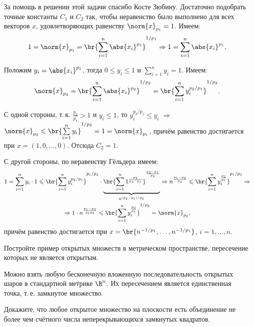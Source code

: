 \begin{solution}
    За помощь в решении этой задачи спасибо Косте Зюбину. Достаточно подобрать точные константы $C_1$ и $C_2$ так, чтобы неравенство было выполнено для всех векторов $x$, удовлетворяющих равенству $\norm{x}_{p_1} = 1$. Имеем:
    \[
        1 = \norm{x}_{p_1} = \br{\sum_{i = 1}^n\abs{x_i}^{p_1}}^{1 / p_1} \Rightarrow 1 = \sum_{i = 1}^n\abs{x_i}^{p_1}.
    \]

    Положим $y_i = \abs{x_i}^{p_1}$, тогда $0 \leqslant y_i \leqslant 1$ и $\sum\limits_{i = 1}^ny_i = 1$. Имеем:
    \[
        \norm{x}_{p_2} = \br{\sum_{i = 1}^n\abs{x_i}^{p_2}}^{1 / p_2} = \br{\sum_{i = 1}^ny_i^{p_2 / p_1}}^{1 / p_2}.
    \]

    С одной стороны, т.\,к. $\frac{p_2}{p_1} > 1$ и $y_i \leqslant 1$, то $y_i^{p_2 / p_1} \leqslant y_i$ $\Rightarrow$ $\norm{x}_{p_2} \leqslant \br{\sum\limits_{i = 1}^ny_i}^{1 / p_2} = 1 = \norm{x}_{p_1}$, причём равенство достигается при $x = (1, 0, \ldots, 0)$. Отсюда $C_2 = 1$.

    С другой стороны, по неравенству Гёльдера имеем:
    \begin{multline*}
        1 = \sum_{i = 1}^ny_i \cdot 1 \leqslant \br{\sum_{i = 1}^ny_i^{p_2 / p_1}}^{p_1 / p_2} \cdot \underbrace{\br{\sum_{i = 1}^n1^{\frac{p_2}{p_2 - p_1}}}^{\frac{p_2 - p_1}{p_2}}}_{n^{(p_2 - p_1) / p_2}} \Rightarrow
        n^{\frac{p_1 - p_2}{p_2}} \leqslant \br{\sum_{i = 1}^ny_i^{\frac{p_2}{p_1}}}^{p_1 / p_2} \Rightarrow \\ \Rightarrow 1 \cdot n^{\frac{p_1 - p_2}{p_1p_2}} \leqslant \br{\sum_{i = 1}^ny_i^{\frac{p_2}{p_1}}}^{1 / p_2} = \norm{x}_{p_2},
    \end{multline*}
    причём равенство достигается при $x = \br{n^{-1 / p_1}, \ldots, n^{-1 / p_1}}$, $i = 1, \ldots, n$.
\end{solution}

\begin{problem}[50$^\circ$]
    Постройте пример открытых множеств в метрическом пространстве, пересечение которых не является открытым.
\end{problem}

\begin{solution}
    Можно взять любую бесконечную вложенную последовательность открытых шаров в стандартной метрике $\R^n$. Их пересечением является единственная точка, т.\,е. замкнутое множество.
\end{solution}

\begin{problem}[51]
    Докажите, что любое открытое множество на плоскости есть объединение не более чем счётного числа неперекрывающихся замкнутых квадратов.
\end{problem}


